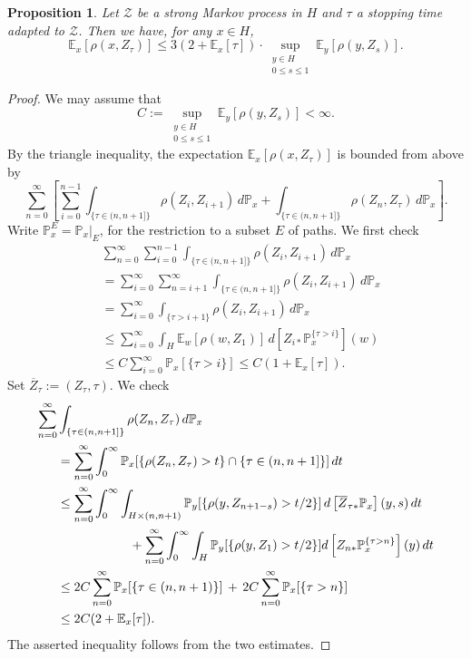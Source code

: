 \documentclass[12pt,a4paper]{amsart}
\numberwithin{equation}{section}
\newtheorem{prop}[equation]{Proposition}
\theoremstyle{definition}
\def\E{\mathbb E}
\def\p{\mathbb P}
\begin{document}
\begin{prop}\label{linmom}
Let $\mathcal Z$ be a strong Markov process in $H$ and $\tau$ a stopping time adapted to $\mathcal Z$.
Then we have, for any $x\in H$, 
$$\E_x[\rho(x,Z_\tau)]\leq 3(2+\E_x[\tau])\cdot \sup_{\substack{y\in H\\0\leq s\leq 1}}\E_y[\rho(y,Z_s)].$$
\end{prop}

\begin{proof}
We may assume that \[C:=\sup_{\substack{y\in H\\0\leq s\leq 1}}\E_y[\rho(y,Z_s)]<\infty.\]
By the triangle inequality, the expectation $\E_x[\rho(x,Z_\tau)]$ is bounded from above by
\begin{equation*}
    \sum_{n=0}^\infty \left[\sum_{i=0}^{n-1} \int_{\{\tau\in(n,n+1]\}}\rho(Z_i,Z_{i+1}) \,d\p_x+\int_{\{\tau\in(n,n+1]\}}\rho(Z_n,Z_\tau)\,d\p_x\right] .
\end{equation*}
Write $\p_x^E=\p_x|_E$, for the restriction to a subset $E$ of paths. We first check
\begin{align*}
&\sum_{n=0}^\infty \sum_{i=0}^{n-1}\int_{\{\tau\in(n,n+1]\}}\rho(Z_i,Z_{i+1}) \,d\p_x \\
&= \sum_{i=0}^\infty \sum_{n=i+1}^{\infty}\int_{\{\tau\in(n,n+1]\}}\rho(Z_i,Z_{i+1}) \,d\p_x \\
&=\sum_{i=0}^\infty \int_{\{\tau> i + 1\}}\rho(Z_i,Z_{i+1}) \,d\p_x \\
&\leq\sum_{i=0}^\infty  \int_H \E_w[\rho(w,Z_1)]\,d\left[Z_{i\ast}\p_x^{\{\tau>i\}}\right](w) \\
&\leq C\sum_{i=0}^\infty \p_x[\{\tau>i\}]
\leq C(1+\E_x[\tau]).
\end{align*}
Set $\overline{Z}_\tau:=(Z_\tau,\tau)$. We check
{\allowdisplaybreaks
\begin{align*}
\sum_{n=0}^\infty &\int_{\{\tau\in(n,n+1]\}}\rho(Z_n,Z_\tau)\,d\p_x \\
&= \sum_{n=0}^\infty \int_0^\infty \p_x[\{\rho(Z_n,Z_\tau)>t\}\cap \{\tau\in(n,n+1]\}]\,dt \\
& \leq   \sum_{n=0}^\infty \int_0^\infty \int_{H\times (n,n+1)} \p_y[\{ \rho(y,Z_{ n+1-s})>t/2 \}]\,d\left[\overline{Z}_{\tau\ast}\p_x\right](y,s)\,dt \\
&\hspace{20mm}+ \sum_{n=0}^\infty \int_0^\infty \int_H  \p_y[\{\rho(y,Z_1)>t/2\}] d\left[Z_{n\ast}\p_x^{\{\tau>n\}}\right](y)\,dt \\
& \leq 2C \sum_{n=0}^\infty  \p_x[\{\tau\in(n,n+1)\}]\,+\, 2C\sum_{n=0}^\infty \p_x[\{\tau>n\}] \\
&\leq 2C(2+\E_x[\tau]).
\end{align*}}
The asserted inequality follows from the two estimates.
\end{proof}
\end{document}
